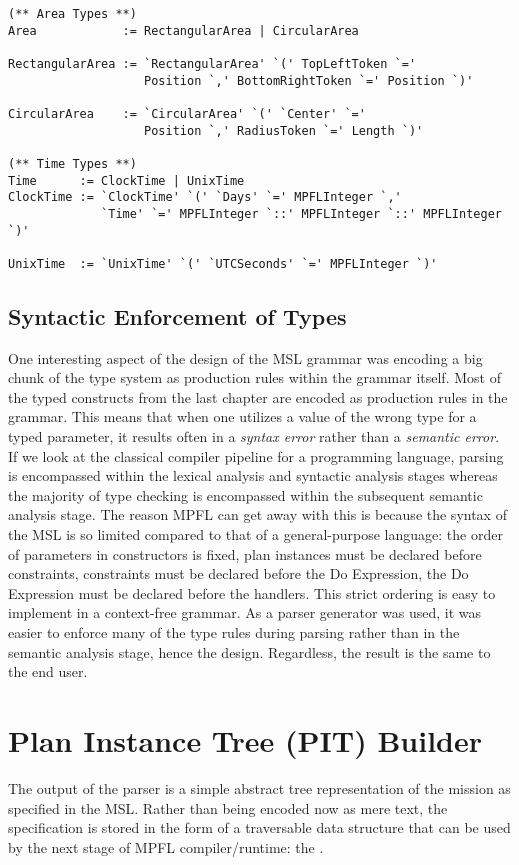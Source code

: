 \begin{verbatim}
(** Area Types **)
Area            := RectangularArea | CircularArea

RectangularArea := `RectangularArea' `(' TopLeftToken `=' 
                   Position `,' BottomRightToken `=' Position `)' 

CircularArea    := `CircularArea' `(' `Center' `='
                   Position `,' RadiusToken `=' Length `)'

(** Time Types **)
Time      := ClockTime | UnixTime
ClockTime := `ClockTime' `(' `Days' `=' MPFLInteger `,'
             `Time' `=' MPFLInteger `::' MPFLInteger `::' MPFLInteger `)'

UnixTime  := `UnixTime' `(' `UTCSeconds' `=' MPFLInteger `)' 
\end{verbatim}

\subsection{Syntactic Enforcement of Types}
One interesting aspect of the design of the MSL grammar was encoding a big chunk of the type system as production rules within the grammar itself. Most of the typed constructs from the last chapter are encoded as production rules in the grammar. This means that when one utilizes a value of the wrong type for a typed parameter, it results often in a \emph{syntax error} rather than a \emph{semantic error}. If we look at the classical compiler pipeline for a programming language, parsing is encompassed within the lexical analysis and syntactic analysis stages whereas the majority of type checking is encompassed within the subsequent semantic analysis stage. The reason MPFL can get away with this is because the syntax of the MSL is so limited compared to that of a general-purpose language: the order of parameters in constructors is fixed, plan instances must be declared before constraints, constraints must be declared before the Do Expression, the Do Expression must be declared before the handlers. This strict ordering is easy to implement in a context-free grammar. As a parser generator was used, it was easier to enforce many of the type rules during parsing rather than in the semantic analysis stage, hence the design. Regardless, the result is the same to the end user.

\section{Plan Instance Tree (PIT) Builder} 
The output of the parser is a simple abstract tree representation of the mission as specified in the MSL. Rather than being encoded now as mere text, the specification is stored in the form of a traversable data structure that can be used by the next stage of MPFL compiler/runtime: the .

